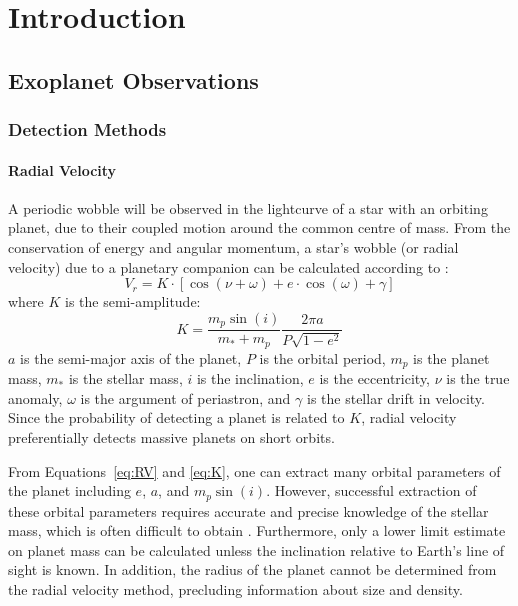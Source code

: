 \chapter{Introduction}
\label{chap:intro}

\section{Exoplanet Observations}
\subsection{Detection Methods}
\subsubsection{Radial Velocity}
\label{sec:RV}
A periodic wobble will be observed in the lightcurve of a star with an orbiting planet, due to their coupled motion around the common centre of mass. 
From the conservation of energy and angular momentum, a star's wobble (or radial velocity) due to a planetary companion can be calculated according to \citep{Beauge2007}:
\begin{equation}
V_r = K \cdot [\cos(\nu + \omega) + e\cdot \cos(\omega) + \gamma]
\label{eq:RV}
\end{equation}
where $K$ is the semi-amplitude:
\begin{equation}
K = \frac{m_p \sin(i)}{m_* + m_p} \frac{2\pi a}{P\sqrt{1-e^2}}
\label{eq:K}
\end{equation}
$a$ is the semi-major axis of the planet, $P$ is the orbital period, $m_p$ is the planet mass, $m_*$ is the stellar mass, $i$ is the inclination, $e$ is the eccentricity, $\nu$ is the true anomaly, $\omega$ is the argument of periastron, and $\gamma$ is the stellar drift in velocity.
Since the probability of detecting a planet is related to $K$, radial velocity preferentially detects massive planets on short orbits. 

From Equations~\ref{eq:RV} and \ref{eq:K}, one can extract many orbital parameters of the planet including $e$, $a$, and $m_p\sin(i)$.
However, successful extraction of these orbital parameters requires accurate and precise knowledge of the stellar mass, which is often difficult to obtain \citep[e.g.][]{Brown2011}.
Furthermore, only a lower limit estimate on planet mass can be calculated unless the inclination relative to Earth's line of sight is known. 
In addition, the radius of the planet cannot be determined from the radial velocity method, precluding information about size and density.

